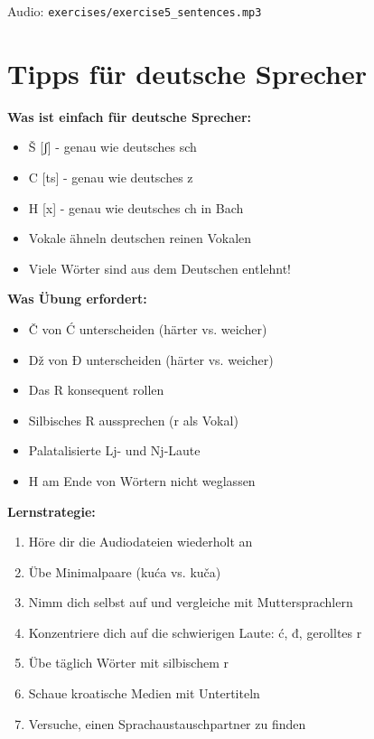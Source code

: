Audio: \texttt{exercises/exercise5\_sentences.mp3}

\section{Tipps für deutsche Sprecher}

\begin{tcolorbox}[colback=lightblue!20, colframe=croatianblue, title=\textbf{Spezielle Tipps}]

\textbf{Was ist einfach für deutsche Sprecher:}
\begin{itemize}
    \item Š [ʃ] - genau wie deutsches \glqq sch\grqq{}
    \item C [ts] - genau wie deutsches \glqq z\grqq{}
    \item H [x] - genau wie deutsches \glqq ch\grqq{} in \glqq Bach\grqq{}
    \item Vokale ähneln deutschen reinen Vokalen
    \item Viele Wörter sind aus dem Deutschen entlehnt!
\end{itemize}

\textbf{Was Übung erfordert:}
\begin{itemize}
    \item Č von Ć unterscheiden (härter vs. weicher)
    \item Dž von Đ unterscheiden (härter vs. weicher)
    \item Das R konsequent rollen
    \item Silbisches R aussprechen (r als Vokal)
    \item Palatalisierte Lj- und Nj-Laute
    \item H am Ende von Wörtern nicht weglassen
\end{itemize}

\textbf{Lernstrategie:}
\begin{enumerate}
    \item Höre dir die Audiodateien wiederholt an
    \item Übe Minimalpaare (kuća vs. kuča)
    \item Nimm dich selbst auf und vergleiche mit Muttersprachlern
    \item Konzentriere dich auf die schwierigen Laute: ć, đ, gerolltes r
    \item Übe täglich Wörter mit silbischem r
    \item Schaue kroatische Medien mit Untertiteln
    \item Versuche, einen Sprachaustauschpartner zu finden
\end{enumerate}

\end{tcolorbox}

